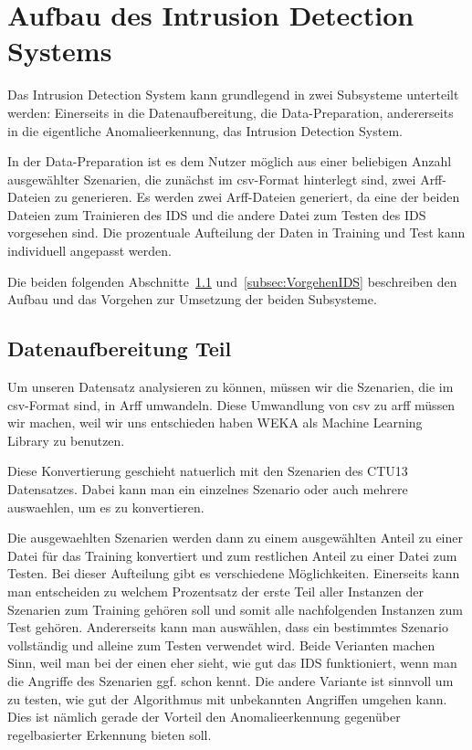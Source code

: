 \documentclass[main.tex]{subfiles}
\begin{document}
\section{Aufbau des Intrusion Detection Systems}

Das Intrusion Detection System kann grundlegend in zwei Subsysteme unterteilt werden: Einerseits in die Datenaufbereitung, die Data-Preparation, andererseits in die eigentliche Anomalieerkennung, das Intrusion Detection System.

In der Data-Preparation ist es dem Nutzer möglich aus einer beliebigen Anzahl ausgewählter Szenarien, die zunächst im csv-Format hinterlegt sind, zwei Arff-Dateien zu generieren. Es werden zwei Arff-Dateien generiert, da eine der beiden Dateien zum Trainieren des IDS und die andere Datei zum Testen des IDS vorgesehen sind. Die prozentuale Aufteilung der Daten in Training und Test kann individuell angepasst werden.

Die beiden folgenden Abschnitte~\ref{subsec:VorgehenDatenaufbereitung}
und~\ref{subsec:VorgehenIDS} beschreiben den Aufbau und das Vorgehen zur
Umsetzung der beiden Subsysteme.

\subsection{Datenaufbereitung Teil} \label{subsec:VorgehenDatenaufbereitung}

Um unseren Datensatz analysieren zu können, müssen wir die Szenarien, die im csv-Format sind, in Arff umwandeln.
Diese Umwandlung von csv zu arff müssen wir machen, weil wir uns entschieden
haben WEKA als Machine Learning Library zu benutzen.

Diese Konvertierung geschieht natuerlich mit den Szenarien des CTU13
Datensatzes.
Dabei kann man ein einzelnes Szenario oder auch mehrere auswaehlen, um es zu
konvertieren.

Die ausgewaehlten Szenarien werden dann zu einem ausgewählten Anteil zu einer Datei
für das Training konvertiert und zum restlichen Anteil zu einer Datei zum Testen.
Bei dieser Aufteilung gibt es verschiedene Möglichkeiten. Einerseits kann man
entscheiden zu welchem Prozentsatz der erste Teil aller Instanzen der
Szenarien zum Training gehören soll und somit alle nachfolgenden Instanzen zum
Test gehören.
Andererseits kann man auswählen, dass ein bestimmtes Szenario vollständig und
alleine zum Testen verwendet wird.
Beide Verianten machen Sinn, weil man bei der einen eher sieht, wie gut das IDS
funktioniert, wenn man die Angriffe des Szenarien ggf. schon kennt.
Die andere Variante ist sinnvoll um zu testen, wie gut der Algorithmus mit
unbekannten Angriffen umgehen kann. Dies ist nämlich gerade der Vorteil den
Anomalieerkennung gegenüber regelbasierter Erkennung bieten soll.
\end{document}
